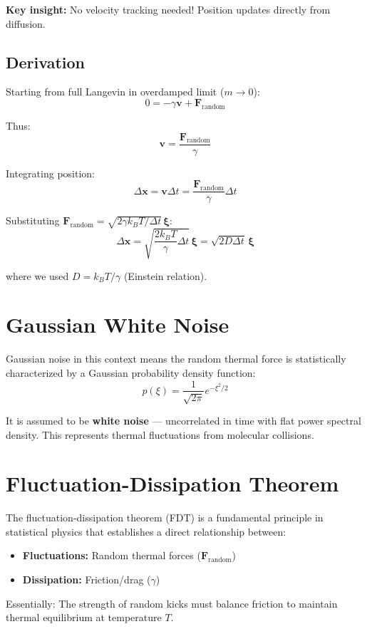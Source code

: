 \documentclass{article}
\begin{document}
\textbf{Key insight:} No velocity tracking needed! Position updates directly from diffusion.

\subsection{Derivation}

Starting from full Langevin in overdamped limit ($m \to 0$):
\[
0 = -\gamma \mathbf{v} + \mathbf{F}_{\text{random}}
\]

Thus:
\[
\mathbf{v} = \frac{\mathbf{F}_{\text{random}}}{\gamma}
\]

Integrating position:
\[
\Delta \mathbf{x} = \mathbf{v} \Delta t = \frac{\mathbf{F}_{\text{random}}}{\gamma} \Delta t
\]

Substituting $\mathbf{F}_{\text{random}} = \sqrt{2\gamma k_B T / \Delta t} \, \boldsymbol{\xi}$:
\[
\Delta \mathbf{x} = \sqrt{\frac{2k_B T}{\gamma} \Delta t} \, \boldsymbol{\xi} = \sqrt{2D\Delta t} \, \boldsymbol{\xi}
\]

where we used $D = k_B T / \gamma$ (Einstein relation).

\section{Gaussian White Noise}

Gaussian noise in this context means the random thermal force is statistically characterized by a Gaussian probability density function:
\[
p(\xi) = \frac{1}{\sqrt{2\pi}} e^{-\xi^2/2}
\]

It is assumed to be \textbf{white noise} — uncorrelated in time with flat power spectral density. This represents thermal fluctuations from molecular collisions.

\section{Fluctuation-Dissipation Theorem}

The fluctuation-dissipation theorem (FDT) is a fundamental principle in statistical physics that establishes a direct relationship between:
\begin{itemize}
    \item \textbf{Fluctuations:} Random thermal forces ($\mathbf{F}_{\text{random}}$)
    \item \textbf{Dissipation:} Friction/drag ($\gamma$)
\end{itemize}

Essentially: The strength of random kicks must balance friction to maintain thermal equilibrium at temperature $T$.
\end{document}
